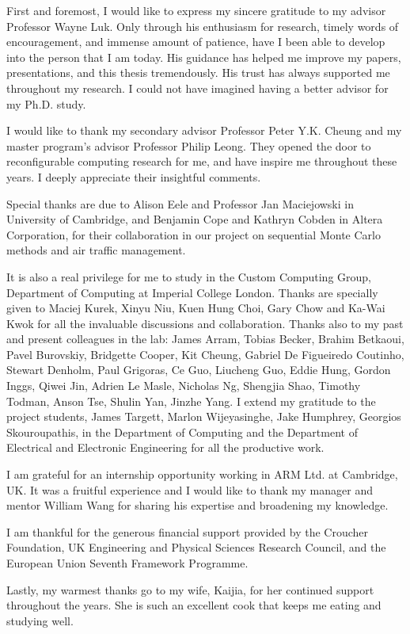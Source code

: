 
\cleardoublepage

{}

\begin{acknowledgements}

First and foremost, I would like to express my sincere gratitude to my advisor Professor Wayne Luk.
Only through his enthusiasm for research, timely words of encouragement, and immense amount of patience, have I been able to develop into the person that I am today.
His guidance has helped me improve my papers, presentations, and this thesis tremendously.
His trust has always supported me throughout my research.
I could not have imagined having a better advisor for my Ph.D. study.

I would like to thank my secondary advisor Professor Peter Y.K. Cheung and my master program's advisor Professor Philip Leong.
They opened the door to reconfigurable computing research for me, and have inspire me throughout these years.
I deeply appreciate their insightful comments.

Special thanks are due to Alison Eele and Professor Jan Maciejowski in University of Cambridge, and Benjamin Cope and Kathryn Cobden in Altera Corporation, for their collaboration in our project on sequential Monte Carlo methods and air traffic management.

It is also a real privilege for me to study in the Custom Computing Group, Department of Computing at Imperial College London.
Thanks are specially given to Maciej Kurek, Xinyu Niu, Kuen Hung Choi, Gary Chow and Ka-Wai Kwok for all the invaluable discussions and collaboration.
Thanks also to my past and present colleagues in the lab: James Arram, Tobias Becker, Brahim Betkaoui, Pavel Burovskiy, Bridgette Cooper, Kit Cheung, Gabriel De Figueiredo Coutinho, Stewart Denholm, Paul Grigoras, Ce Guo, Liucheng Guo, Eddie Hung, Gordon Inggs, Qiwei Jin, Adrien Le Masle, Nicholas Ng, Shengjia Shao, Timothy Todman, Anson Tse, Shulin Yan, Jinzhe Yang.
I extend my gratitude to the project students, James Targett, Marlon Wijeyasinghe, Jake Humphrey, Georgios Skouroupathis, in the Department of Computing and the Department of Electrical and Electronic Engineering for all the productive work.

I am grateful for an internship opportunity working in ARM Ltd. at Cambridge, UK.
It was a fruitful experience and I would like to thank my manager and mentor William Wang for sharing his expertise and broadening my knowledge.

I am thankful for the generous financial support provided by the Croucher Foundation, UK Engineering and Physical Sciences Research Council, and the European Union Seventh Framework Programme.

Lastly, my warmest thanks go to my wife, Kaijia, for her continued support throughout the years.
She is such an excellent cook that keeps me eating and studying well.

\end{acknowledgements}
